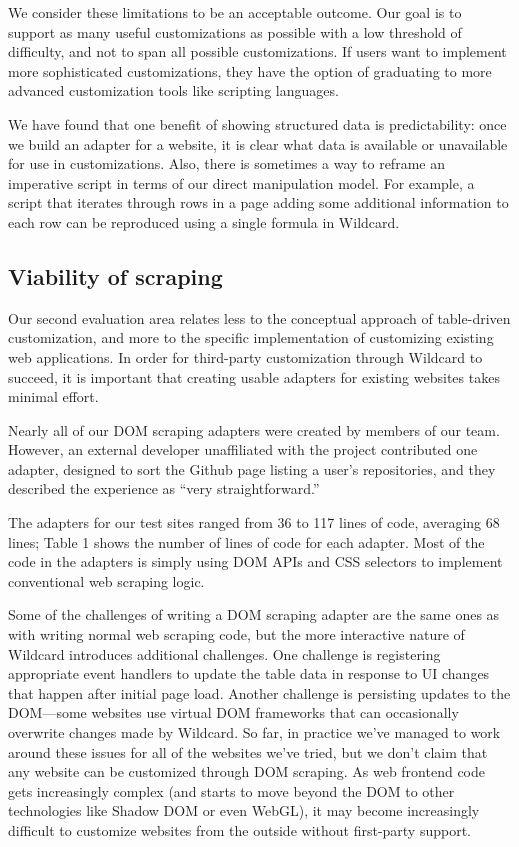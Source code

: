 \documentclass[sigplan,screen,10pt,anonymous,review]{acmart}
\begin{document}
We consider these limitations to be an acceptable outcome. Our goal is
to support as many useful customizations as possible with a low
threshold of difficulty, and not to span all possible customizations. If
users want to implement more sophisticated customizations, they have the
option of graduating to more advanced customization tools like scripting
languages.

We have found that one benefit of showing structured data is
predictability: once we build an adapter for a website, it is clear what
data is available or unavailable for use in customizations. Also, there
is sometimes a way to reframe an imperative script in terms of our
direct manipulation model. For example, a script that iterates through
rows in a page adding some additional information to each row can be
reproduced using a single formula in Wildcard.

\hypertarget{viability-of-scraping}{%
\subsection{Viability of scraping}\label{viability-of-scraping}}

Our second evaluation area relates less to the conceptual approach of
table-driven customization, and more to the specific implementation of
customizing existing web applications. In order for third-party
customization through Wildcard to succeed, it is important that creating
usable adapters for existing websites takes minimal effort.

Nearly all of our DOM scraping adapters were created by members of our
team. However, an external developer unaffiliated with the project
contributed one adapter, designed to sort the Github page listing a
user's repositories, and they described the experience as ``very
straightforward.''

The adapters for our test sites ranged from 36 to 117 lines of code,
averaging 68 lines; Table 1 shows the number of lines of code for each
adapter. Most of the code in the adapters is simply using DOM APIs and
CSS selectors to implement conventional web scraping logic.

Some of the challenges of writing a DOM scraping adapter are the same
ones as with writing normal web scraping code, but the more interactive
nature of Wildcard introduces additional challenges. One challenge is
registering appropriate event handlers to update the table data in
response to UI changes that happen after initial page load. Another
challenge is persisting updates to the DOM---some websites use virtual
DOM frameworks that can occasionally overwrite changes made by Wildcard.
So far, in practice we've managed to work around these issues for all of
the websites we've tried, but we don't claim that any website can be
customized through DOM scraping. As web frontend code gets increasingly
complex (and starts to move beyond the DOM to other technologies like
Shadow DOM or even WebGL), it may become increasingly difficult to
customize websites from the outside without first-party support.
\end{document}
